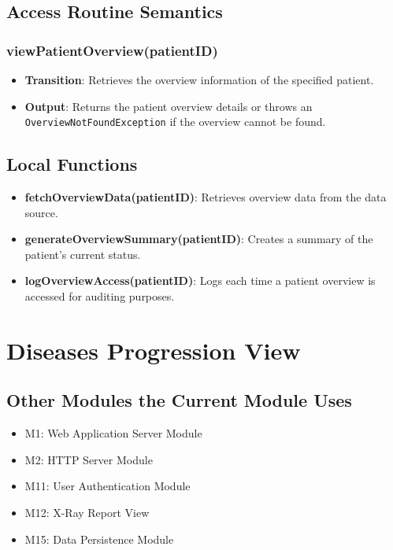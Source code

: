 \documentclass[12pt, titlepage]{article}
\begin{document}
\subsection{Access Routine Semantics}
\subsubsection{viewPatientOverview(patientID)}
\begin{itemize}
    \item \textbf{Transition}: Retrieves the overview information of the specified patient.
    \item \textbf{Output}: Returns the patient overview details or throws an \texttt{OverviewNotFoundException} if the overview cannot be found.
\end{itemize}

\subsection{Local Functions}
\begin{itemize}
\item \textbf{fetchOverviewData(patientID)}: Retrieves overview data from the data source.
\item \textbf{generateOverviewSummary(patientID)}: Creates a summary of the patient's current status.
\item \textbf{logOverviewAccess(patientID)}: Logs each time a patient overview is accessed for auditing purposes.
\end{itemize}
\section{Diseases Progression View}

\subsection{Other Modules the Current Module Uses}
\begin{itemize}
\item M1: Web Application Server Module
\item M2: HTTP Server Module
\item M11: User Authentication Module
\item M12: X-Ray Report View
\item M15: Data Persistence Module
\end{itemize}
\end{document}
